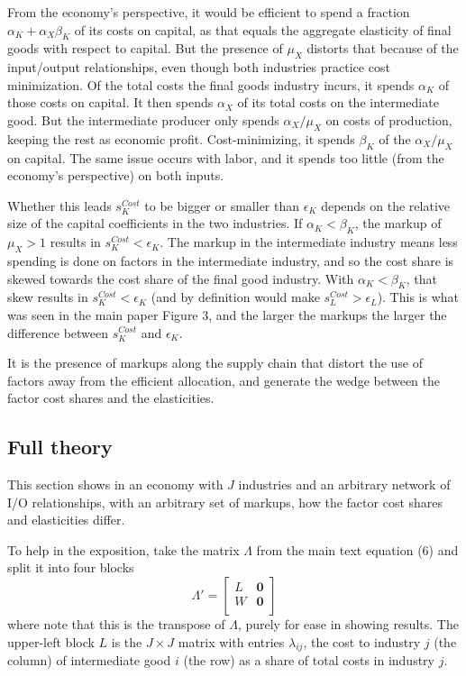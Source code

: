 \documentclass[11pt]{article}
\begin{document}
From the economy's perspective, it would be efficient to spend a fraction $\alpha_K + \alpha_X \beta_K$ of its costs on capital, as that equals the aggregate elasticity of final goods with respect to capital. But the presence of $\mu_X$ distorts that because of the input/output relationships, even though both industries practice cost minimization. Of the total costs the final goods industry incurs, it spends $\alpha_K$ of those costs on capital. It then spends $\alpha_X$ of its total costs on the intermediate good. But the intermediate producer only spends $\alpha_X/\mu_X$ on costs of production, keeping the rest as economic profit. Cost-minimizing, it spends $\beta_K$ of the $\alpha_X/\mu_X$ on capital. The same issue occurs with labor, and it spends too little (from the economy's perspective) on both inputs. 

Whether this leads $s_K^{Cost}$ to be bigger or smaller than $\epsilon_K$ depends on the relative size of the capital coefficients in the two industries. If $\alpha_K < \beta_K$, the markup of $\mu_X > 1$ results in $s_K^{Cost} < \epsilon_K$. The markup in the intermediate industry means less spending is done on factors in the intermediate industry, and so the cost share is skewed towards the cost share of the final good industry. With $\alpha_K < \beta_K$, that skew results in $s_K^{Cost} < \epsilon_K$ (and by definition would make $s_L^{Cost} > \epsilon_L$). This is what was seen in the main paper Figure 3, and the larger the markups the larger the difference between $s_K^{Cost}$ and $\epsilon_K$.

It is the presence of markups along the supply chain that distort the use of factors away from the efficient allocation, and generate the wedge between the factor cost shares and the elasticities.

\subsection{Full theory}
This section shows in an economy with $J$ industries and an arbitrary network of I/O relationships, with an arbitrary set of markups, how the factor cost shares and elasticities differ. 

To help in the exposition, take the matrix $\Lambda$ from the main text equation (6) and split it into four blocks
\begin{equation}
	\Lambda' = 
	\begin{bmatrix}
		L & \mathbf{0} \\
		W & \mathbf{0} \\
	\end{bmatrix} \label{EQ_Lambda}
\end{equation}
where note that this is the transpose of $\Lambda$, purely for ease in showing results. The upper-left block $L$ is the $J \times J$ matrix with entries $\lambda_{ij}$, the cost to industry $j$ (the column) of intermediate good $i$ (the row) as a share of total costs in industry $j$. 
\end{document}
